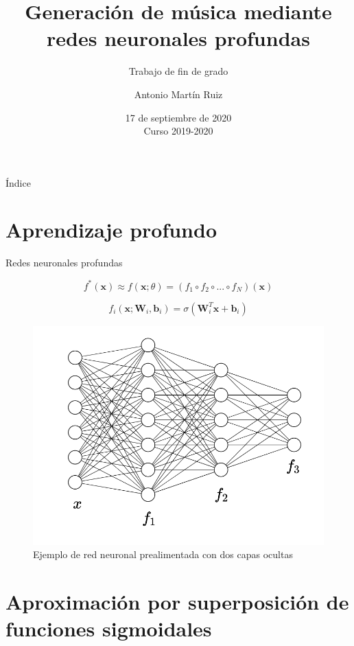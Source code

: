 \documentclass[spanish]{beamer}
\title{Generación de música mediante redes neuronales profundas}
\subtitle{Trabajo de fin de grado}
\author{Antonio Martín Ruiz}
\institute{\normalsize Universidad de Granada}
\date{17 de septiembre de 2020\texorpdfstring{\\}{} \small Curso 2019-2020}
\begin{document}
\maketitle

\begin{frame}{Índice}
\tableofcontents
\end{frame}

\section{Aprendizaje profundo}

\begin{frame}{Redes neuronales profundas}

$$f^*(\mathbf{x}) \approx f(\mathbf{x}; \theta) = (f_1 \circ f_2 \circ ... \circ f_N)(\mathbf{x}) $$

$$f_i(\mathbf{x};\mathbf{W}_i,\mathbf{b}_i) = \sigma(\mathbf{W}_i^T\mathbf{x} + \mathbf{b}_i)$$
\begin{figure}
\includegraphics[scale=0.20]{img/nn1.png}
\caption{Ejemplo de red neuronal prealimentada con dos capas ocultas}
\end{figure}

\end{frame}

\section{Aproximación por superposición de funciones sigmoidales}
\end{document}
